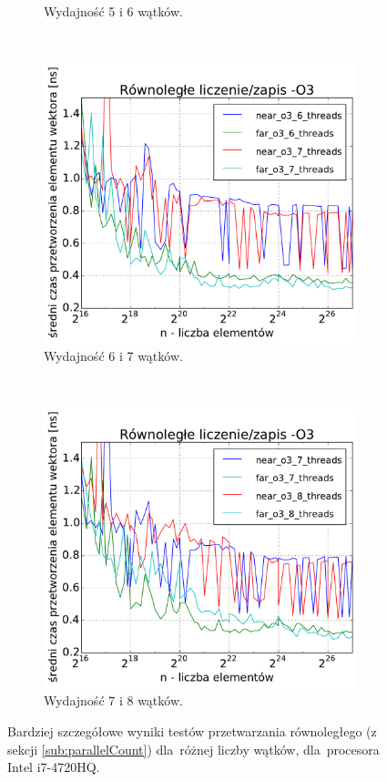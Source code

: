 \begin{figure}
\begin{subfigure}[c]{0.45\textwidth}
        \caption{Wydajność 5 i 6 wątków.}
    \end{subfigure}
    \\
    \vspace{0.5cm}
    \begin{subfigure}[c]{0.45\textwidth}
        \centering
        \includegraphics[width=\textwidth]{images/benchs/parallel_count_interesting5}
        \caption{Wydajność 6 i 7 wątków.}
    \end{subfigure}
    ~
    \begin{subfigure}[c]{0.45\textwidth}
        \centering
        \includegraphics[width=\textwidth]{images/benchs/parallel_count_interesting6}
        \caption{Wydajność 7 i 8 wątków.}
    \end{subfigure}
    \caption{Bardziej szczegółowe wyniki testów przetwarzania równoległego (z sekcji \ref{sub:parallelCount}) dla~różnej liczby wątków, dla~procesora Intel i7-4720HQ.}
    \label{fig:parallelCountInteresting}
\end{figure}

